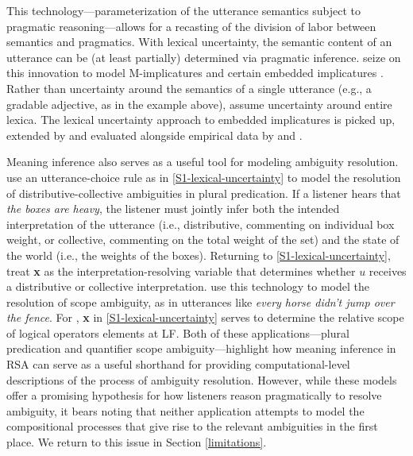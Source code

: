 \documentclass{sp}
\begin{document}
This technology---parameterization of the utterance semantics subject to pragmatic reasoning---allows for a recasting of the division of labor between semantics and pragmatics. With lexical uncertainty, the semantic content of an utterance can be (at least partially) determined via pragmatic inference. \cite{bergenetal2016} seize on this innovation to model M-implicatures \citep{horn1984} and certain embedded implicatures \citep{hurford1974,chierchiaetal2012}. Rather than uncertainty around the semantics of a single utterance (e.g., a gradable adjective, as in the example above), \citeauthor{bergenetal2016} assume uncertainty around entire lexica.
The lexical uncertainty approach to embedded implicatures is picked up, extended by and evaluated alongside empirical data by \cite{PottsLassiter2016:Embedded-implic} and \cite{FrankeBergen2020:Theory-driven-s}.

Meaning inference also serves as a useful tool for modeling ambiguity resolution. \cite{scontrasgoodman2017} use an utterance-choice rule as in \eqref{S1-lexical-uncertainty} to model the resolution of distributive-collective ambiguities in plural predication. If a listener hears that \emph{the boxes are heavy}, the listener must jointly infer both the intended interpretation of the utterance (i.e., distributive, commenting on individual box weight, or collective, commenting on the total weight of the set) and the state of the world (i.e., the weights of the boxes). Returning to \eqref{S1-lexical-uncertainty}, \citeauthor{scontrasgoodman2017} treat \textbf{x} as the interpretation-resolving variable that determines whether $u$ receives a distributive or collective interpretation. \cite{savinellietal2017,savinellietal2018} use this technology to model the resolution of scope ambiguity, as in utterances like \emph{every horse didn't jump over the fence}. For \citeauthor{savinellietal2017}, \textbf{x} in \eqref{S1-lexical-uncertainty} serves to determine the relative scope of logical operators elements at LF. 
Both of these applications---plural predication and quantifier scope ambiguity---highlight how meaning inference in RSA can serve as a useful shorthand for providing computational-level descriptions of the process of ambiguity resolution. However, while these models offer a promising hypothesis for how listeners reason pragmatically to resolve ambiguity, it bears noting that neither application attempts to model the compositional processes that give rise to the relevant ambiguities in the first place. We return to this issue in Section \ref{limitations}.
\end{document}
